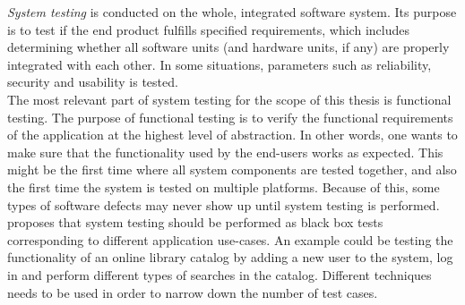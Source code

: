 \emph{System testing} is conducted on the whole, integrated software
system. Its purpose is to test if the end product fulfills specified
requirements, which includes determining whether all software units (and
hardware units, if any) are properly integrated with each other. In some
situations, parameters such as reliability, security and usability is
tested. \cite{book:adp}\\

The most relevant part of system testing for the scope of this thesis is
functional testing. The purpose of functional testing is to verify the
functional requirements of the application at the highest level of
abstraction. In other words, one wants to make sure that the
functionality used by the end-users works as expected. This might be the
first time where all system components are tested together, and also the
first time the system is tested on multiple platforms. Because of this,
some types of software defects may never show up until system testing is
performed. \cite{book:adp}\\

\citeauthor{book:adp} proposes that system testing should be performed
as black box tests corresponding to different application use-cases. An
example could be testing the functionality of an online library catalog
by adding a new user to the system, log in and perform different types
of searches in the catalog. Different techniques needs to be used in
order to narrow down the number of test cases.\\
